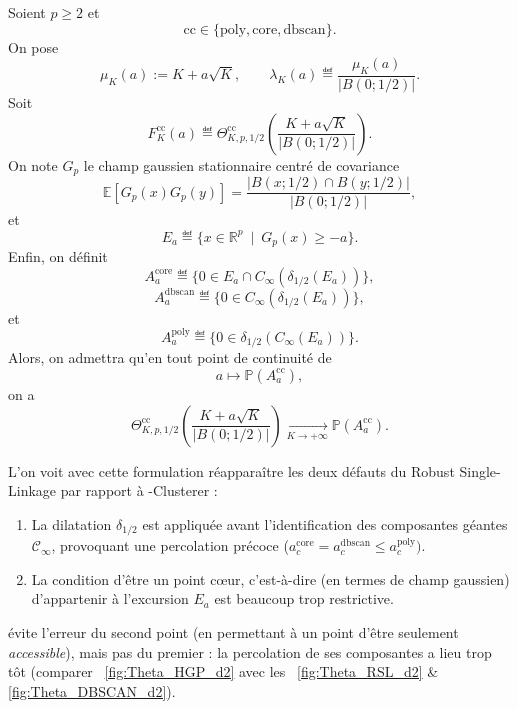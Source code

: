 Soient $p\geq 2$ et
\[
    \mathrm{cc}\in\{\mathrm{poly},\mathrm{core},\mathrm{dbscan}\}.
\]
On pose
\[
    \mu_K(a):=K+a\sqrt K,
    \qquad
    \lambda_K(a) \eqdef \frac{\mu_K(a)}{|B(0;1/2)|}.
\]
Soit
\[
    F_K^{\mathrm{cc}}(a)
    \eqdef
    \Theta^{\mathrm{cc}}_{K,p,1/2}
    \left(
        \frac{K+a\sqrt K}{|B(0;1/2)|}
    \right).
\]
On note $G_p$ le champ gaussien stationnaire centré de covariance
\[
    \mathbb E[G_p(x)G_p(y)]
    =
    \frac{|B(x;1/2)\cap B(y;1/2)|}{|B(0;1/2)|},
\]
et
\[
    E_a \eqdef \{x\in\mathbb R^p \ \mid \ G_p(x)\geq -a\}.
\]
Enfin, on définit
\[
    A_a^{\mathrm{core}}
    \eqdef
    \{0\in E_a\cap C_\infty(\delta_{1/2}(E_a))\},
\]
\[
    A_a^{\mathrm{dbscan}}
    \eqdef
    \{0\in C_\infty(\delta_{1/2}(E_a))\},
\]
et
\[
    A_a^{\mathrm{poly}}
    \eqdef
    \{0\in \delta_{1/2}(C_\infty(E_a))\}.
\]
Alors, on admettra qu'en tout point de continuité de
\[
    a \mapsto \mathbb P(A_a^{\mathrm{cc}}),
\]
on a
\[
    \boxed{
    \Theta^{\mathrm{cc}}_{K,p,1/2}
    \left(
        \frac{K+a\sqrt K}{|B(0;1/2)|}
    \right)
    \xrightarrow[K\to+\infty]{}
    \mathbb P(A_a^{\mathrm{cc}}).
    }
\]



L'on voit avec cette formulation réapparaître les deux défauts du Robust Single-Linkage par rapport à \HGP-Clusterer : 
\begin{enumerate}
    \item La dilatation $\delta_{1/2}$ est appliquée avant l'identification des composantes géantes $\mathcal C_\infty$, provoquant une percolation précoce ($a_c^{\mathrm{core}} = a_c^{\mathrm{dbscan}} \le a_c^{\mathrm{poly}}).$
    \item La condition d'être un point c\oe ur, c'est-à-dire (en termes de champ gaussien) d'appartenir à l'excursion $E_a$ est beaucoup trop restrictive.
\end{enumerate}

\DBSCAN évite l'erreur du second point (en permettant  à un point d'être seulement \emph{accessible}), mais pas du premier : la percolation de ses composantes a lieu trop tôt (comparer \Fig~\ref{fig:Theta_HGP_d2} avec les \Fig~\ref{fig:Theta_RSL_d2} \& \ref{fig:Theta_DBSCAN_d2}). 




